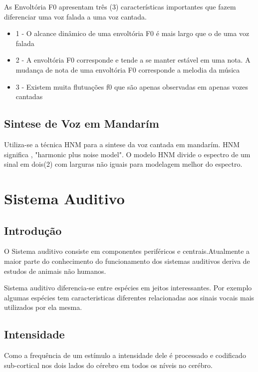 	As Envoltória F0 apresentam três (3) características importantes que fazem diferenciar uma voz falada a uma voz cantada.\cite{SaitouNada}
	\linebreak
	\begin{itemize}
		\item 1 - O alcance dinâmico de uma envoltória F0 é mais largo que o de uma voz falada
		\item 2 - A envoltória F0 corresponde e tende a se manter estável em uma nota. A mudança de nota de uma envoltória F0 corresponde a melodia da música
		\item 3 - Existem muita flutuações f0 que são apenas observadas em apenas vozes cantadas
	\end{itemize}
	
	
	\subsection{Sintese de Voz em Mandarím}
		Utiliza-se a técnica HNM para a sintese da voz cantada em mandarím. HNM significa , "harmonic plus noise model".
		O modelo HNM divide o espectro de um sinal em dois(2) com larguras não iguais para modelagem melhor do espectro.\cite{LinRobos}
	

 

\section{Sistema Auditivo}
	\subsection{Introdução}
	O Sistema auditivo consiste em componentes periféricos e centrais.Atualmente a maior parte do conhecimento do funcionamento dos sistemas auditivos deriva de estudos de animais não humanos.\cite{Foundation1} 
	
	Sistema auditivo diferencia-se entre espécies em jeitos interessantes.
	Por exemplo algumas espécies tem caracteristicas diferentes relacionadas aos sinais vocais mais utilizados por ela mesma.\cite{Foundation1}
	
	\subsection{Intensidade}
	Como a frequência de um estímulo a intensidade dele é processado e codificado sub-cortical nos dois lados do cérebro em todos os níveis no cerébro.\cite{Foundation1}
		


